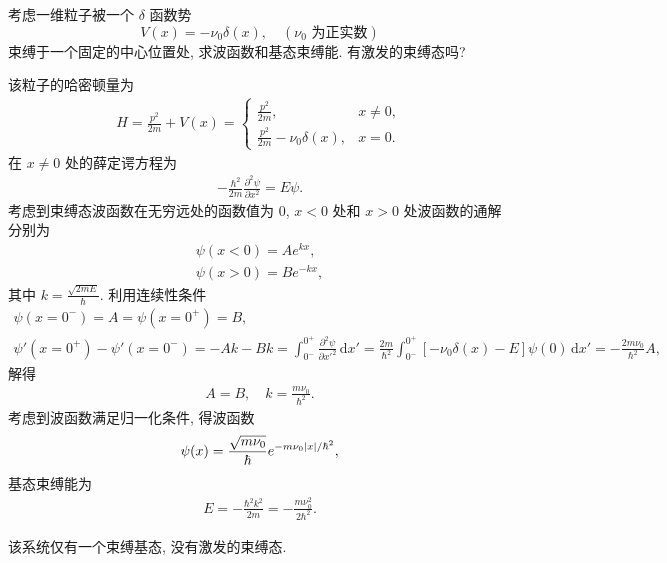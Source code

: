 \documentclass{assignment}
\begin{document}
\begin{prob}[课本习题 2.24]
    考虑一维粒子被一个 $\delta$ 函数势
    \[
        V(x)=-\nu_0\delta(x),\quad(\nu_0\text{ 为正实数})
    \]
    束缚于一个固定的中心位置处, 求波函数和基态束缚能. 有激发的束缚态吗?
\end{prob}
\begin{sol}
    该粒子的哈密顿量为
    \begin{align}
        H=\frac{p^2}{2m}+V(x)=\left\{\begin{array}{ll}
            \frac{p^2}{2m},&x\neq 0,\\
            \frac{p^2}{2m}-\nu_0\delta(x),&x=0.
        \end{array}\right.
    \end{align}
    在 $x\neq 0$ 处的薛定谔方程为
    \begin{align}
        -\frac{\hbar^2}{2m}\frac{\partial^2\psi}{\partial x^2}=E\psi.
    \end{align}
    考虑到束缚态波函数在无穷远处的函数值为 $0$, $x<0$ 处和 $x>0$ 处波函数的通解分别为
    \begin{align}
        \psi(x<0)=Ae^{kx},\\
        \psi(x>0)=Be^{-kx},
    \end{align}
    其中 $k=\frac{\sqrt{2mE}}{\hbar}$.
    利用连续性条件
    \begin{gather}
        \psi(x=0^-)=A=\psi(x=0^+)=B,\\
        \psi'(x=0^+)-\psi'(x=0^-)=-Ak-Bk=\int_{0^-}^{0^+}\frac{\partial^2\psi}{\partial x'^2}\,\mathrm{d}x'=\frac{2m}{\hbar^2}\int_{0^-}^{0^+}[-\nu_0\delta(x)-E]\psi(0)\,\mathrm{d}x'=-\frac{2m\nu_0}{\hbar^2}A,
    \end{gather}
    解得
    \begin{align}
        A=B,\quad k=\frac{m\nu_0}{\hbar^2}.
    \end{align}
    考虑到波函数满足归一化条件, 得波函数
    \begin{align}
        \psi(x)=\frac{\sqrt{m\nu_0}}{\hbar}e^{-m\nu_0\left\lvert x\right\rvert/\hbar^2},
    \end{align}
    基态束缚能为
    \begin{align}
        E=-\frac{\hbar^2k^2}{2m}=-\frac{m\nu_0^2}{2\hbar^2}.
    \end{align}

    该系统仅有一个束缚基态, 没有激发的束缚态.
\end{sol}
\end{document}
